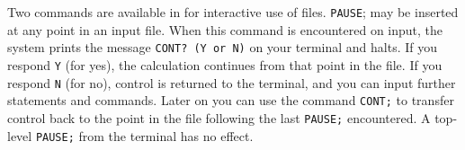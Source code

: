 \hypertarget{CONT-and-PAUSE}{}
Two commands are available in {\REDUCE} for interactive use of files.
\texttt{PAUSE};
may be inserted at any point in an input file.  When this command is
encountered on input, the system prints the message \texttt{CONT? (Y
  or N)} on your terminal and halts.  If you respond \texttt{Y} (for
yes), the calculation continues from that point in the file.  If you
respond \texttt{N} (for no), control is returned to the terminal, and
you can input further statements and commands.  Later on you can use
the command
\texttt{CONT;}
to transfer control back to the point in the file following the last
\texttt{PAUSE;} encountered.  A top-level \texttt{PAUSE;} from the
terminal has no effect.
